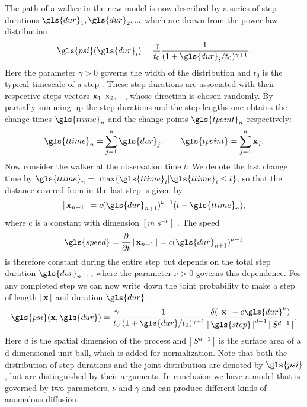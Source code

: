 The path of a walker in the new model is now described by a series of step durations $\gls{dur}_1, \gls{dur}_2, ...$ which are drawn from the power law distribution 
%
\begin{align}
\gls{psi}(\gls{dur}_i) = \frac{\gamma}{t_0} \frac{1}{(1+\gls{dur}_i/t_0)^{\gamma+1}} .
\label{eqn:defPsiT}
\end{align}
%
Here the parameter $\gamma>0$ governs the width of the distribution and { \color{blue}$t_0$ is the typical timescale of a step }. These step durations are associated with their respective steps vectors $\mathbf{ x }_1, \mathbf{ x }_2, ...$, whose direction is chosen randomly. By partially summing up the step durations and the step lengths one obtains the change times $\gls{ttime}_n$ and the change points $\gls{tpoint}_n$ respectively:
%
\begin{align}
\gls{ttime}_n = \sum_{j=1}^n \gls{dur}_j , \qquad \gls{tpoint} = \sum_{j=1}^n \ve{x}_j .
\end{align}
%
Now consider the walker at the observation time $t$: We denote the last change time by $\gls{ttime}_n = \text{ max} \{\gls{ttime}_i | \gls{ttime}_i \leq t \}$, so that the distance covered from in the last step is given by
%
\begin{align}
\abs{\ve{x}_{n+1}} = c (\gls{dur}_{n+1})^{\nu-1} (t-\gls{ttime}_n) ,
\end{align}
%
where c is a constant with dimension $ [ m \; s^{-\nu} ] $ . The speed 
%
\begin{align}
\gls{speed} = \pder{}{t} \abs{\ve{x}_{n+1}} = c (\gls{dur}_{n+1})^{\nu-1}
\end{align}
%
is therefore constant during the entire step but depends on the total step duration $\gls{dur}_{n+1}$, where the parameter $\nu>0$ governs this dependence. For any completed step we can now write down the joint probability to make a step of length $\left|\,\mathbf{ x }\,\right|$ and duration $\gls{dur}$:
%
\begin{align}
\gls{psi}(\ve{x}, \gls{dur} ) = \frac{\gamma}{t_0} \frac{1}{(1+\gls{dur}/t_0)^{\gamma+1}}  \frac{\delta(\abs{\ve{x}} - c \gls{dur}^{\nu}) }{\abs{\gls{step}}^{d-1} \abs{S^{d-1}}}  \label{eqn:defPsiXT}.
\end{align}
%
Here $d$ is the spatial dimension of the process and $\left|\,S^{d-1}\,\right|$ is the surface area of a d-dimensional unit ball, which is added for normalization. Note that both the distribution of step durations and the joint distribution are denoted by $\gls{psi}$, but are distinguished by their arguments. In conclusion we have a model that is governed by two parameters, $\nu$ and $\gamma$ and can produce different kinds of anomalous diffusion. 

